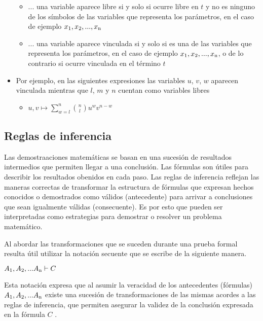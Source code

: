 \begin{itemize}
		\begin{itemize}
			\item{... una variable aparece libre si y solo si ocurre libre en $t$ y no es ninguno de los símbolos de las variables que representa los parámetros, en el caso de ejemplo $x\textsubscript{1}, x\textsubscript{2}, ..., x\textsubscript{n}$}
			\item{... una variable aparece vinculada si  y solo si es una de las variables que representa los parámetros, en el caso de ejemplo $x\textsubscript{1}, x\textsubscript{2}, ..., x\textsubscript{n}$, o de lo contrario si ocurre vinculada en el término $t$ }
		\end{itemize}
	\item{Por ejemplo, en las siguientes expresiones las variables $u$, $v$, $w$ aparecen vinculada mientras que $l$, $m$ y $n$ cuentan como variables libres}
		\begin{itemize}
			\item{$u,v \mapsto {\displaystyle \sum _{w=l}^{n} {{n \choose l}u^w v^{n-w}}}$} 
		\end{itemize}
\end{itemize}

\subsection{Reglas de inferencia}

Las demostraaciones matemáticas se basan en una sucesión de resultados intermedios que permiten llegar a una conclusión. Las fórmulas son útiles para describir los resultados obenidos en cada paso. Las reglas de inferencia reflejan las maneras correctas de transformar la estructura de fórmulas que expresan hechos conocidos o demostrados como válidos (antecedente) para arrivar a conclusiones que sean igualmente válidas (consecuente). Es por esto que pueden ser interpretadas como estrategias para demostrar o resolver un problema matemático.

Al abordar las transformaciones que se suceden durante una prueba formal resulta útil utilizar la notación secuente que se escribe de la siguiente manera.

\begin{center}
$A\textsubscript{1}, A\textsubscript{2}, ... A\textsubscript{n} \vdash C$
\end{center}

Esta notación expresa que al asumir la veracidad de los antecedentes (fórmulas) $A\textsubscript{1}, A\textsubscript{2}, ... A\textsubscript{n}$ existe una sucesión de transformaciones de las mismas acordes a las reglas de inferencia, que permiten asegurar la validez de la conclusión expresada en la fórmula $C$ .

